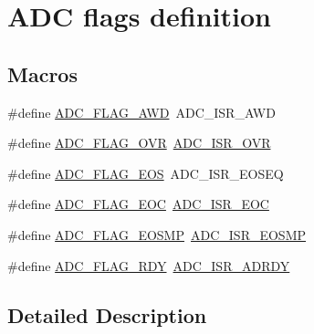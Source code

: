\hypertarget{group___a_d_c__flags__definition}{}\section{A\+DC flags definition}
\label{group___a_d_c__flags__definition}
\subsection*{Macros}
\begin{DoxyCompactItemize}
\item 
\#define \hyperlink{group___a_d_c__flags__definition_gadb75a4b430fb84950232b7a8f3a6a877}{A\+D\+C\+\_\+\+F\+L\+A\+G\+\_\+\+A\+WD}~A\+D\+C\+\_\+\+I\+S\+R\+\_\+\+A\+WD
\item 
\#define \hyperlink{group___a_d_c__flags__definition_ga6e8f399d2af342bd18b9f5803cb986e7}{A\+D\+C\+\_\+\+F\+L\+A\+G\+\_\+\+O\+VR}~\hyperlink{group___peripheral___registers___bits___definition_ga66f58970a53712eed20aaac04c6a6f61}{A\+D\+C\+\_\+\+I\+S\+R\+\_\+\+O\+VR}
\item 
\#define \hyperlink{group___a_d_c__flags__definition_gac3acbfd08e72d33bc520dac5998f7e52}{A\+D\+C\+\_\+\+F\+L\+A\+G\+\_\+\+E\+OS}~A\+D\+C\+\_\+\+I\+S\+R\+\_\+\+E\+O\+S\+EQ
\item 
\#define \hyperlink{group___a_d_c__flags__definition_gaf2c6fdf7e9ab63b778149e5fb56413d4}{A\+D\+C\+\_\+\+F\+L\+A\+G\+\_\+\+E\+OC}~\hyperlink{group___peripheral___registers___bits___definition_ga949681e78b978c1ccd680f11137a1550}{A\+D\+C\+\_\+\+I\+S\+R\+\_\+\+E\+OC}
\item 
\#define \hyperlink{group___a_d_c__flags__definition_gacf79acb4682b5c104fe38f9dff035656}{A\+D\+C\+\_\+\+F\+L\+A\+G\+\_\+\+E\+O\+S\+MP}~\hyperlink{group___peripheral___registers___bits___definition_ga0e8d87957a25e701a13575d635628d11}{A\+D\+C\+\_\+\+I\+S\+R\+\_\+\+E\+O\+S\+MP}
\item 
\#define \hyperlink{group___a_d_c__flags__definition_gaf1a4a140115121cc0ec1f821d2c8c199}{A\+D\+C\+\_\+\+F\+L\+A\+G\+\_\+\+R\+DY}~\hyperlink{group___peripheral___registers___bits___definition_ga06cdc9a3bf111d8c50ecba178daa90d8}{A\+D\+C\+\_\+\+I\+S\+R\+\_\+\+A\+D\+R\+DY}
\end{DoxyCompactItemize}


\subsection{Detailed Description}


